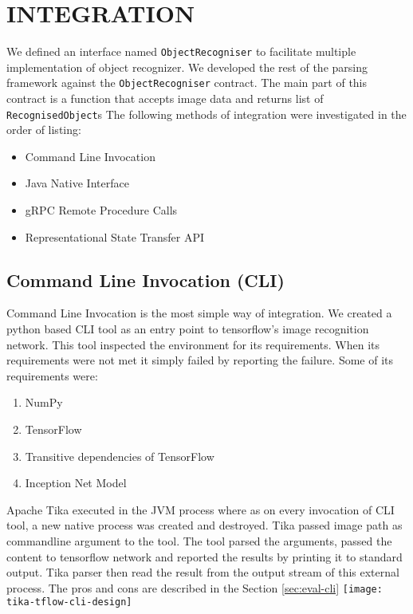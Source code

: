 \section{INTEGRATION} \label{sec:integration}
We defined an interface named \texttt{ObjectRecogniser} to facilitate multiple implementation of object recognizer. We developed the rest of the parsing framework against the \texttt{ObjectRecogniser} contract. The main part of this contract is a function that accepts image data and returns list of \texttt{RecognisedObject}s
The following methods of integration were investigated in the order of listing:
\begin{itemize}
\item Command Line Invocation
\item Java Native Interface
\item gRPC Remote Procedure Calls
\item Representational State Transfer API
\end{itemize}
\subsection{Command Line Invocation (CLI)} \label{sec:int-cli}
Command Line Invocation is the most simple way of integration. We created a python based CLI tool as an entry point to tensorflow's image recognition network. This tool inspected the environment for its requirements. When its requirements were not met it simply failed by reporting the failure. Some of its requirements were:
\begin{enumerate}
\item NumPy
\item TensorFlow
\item Transitive dependencies of TensorFlow
\item Inception Net Model
\end{enumerate}
Apache Tika executed in the JVM process where as on every invocation of CLI tool, a new native process was created and destroyed.  Tika passed image path as commandline argument to the tool. The tool parsed the arguments, passed the content to tensorflow network and reported the results by printing it to standard output.  Tika parser then read the result from the output stream of this external process. The pros and cons are described in the Section \ref{sec:eval-cli}
\texttt{[image: tika-tflow-cli-design]}

